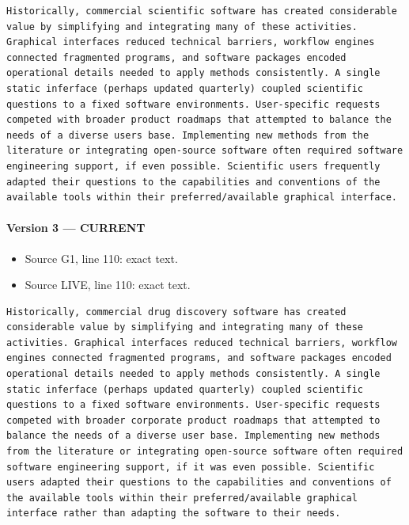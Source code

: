 \documentclass[11pt]{article}
\begin{document}
\begin{lstlisting}
Historically, commercial scientific software has created considerable value by simplifying and integrating many of these activities. Graphical interfaces reduced technical barriers, workflow engines connected fragmented programs, and software packages encoded operational details needed to apply methods consistently. A single static inferface (perhaps updated quarterly) coupled scientific questions to a fixed software environments. User-specific requests competed with broader product roadmaps that attempted to balance the needs of a diverse users base. Implementing new methods from the literature or integrating open-source software often required software engineering support, if even possible. Scientific users frequently adapted their questions to the capabilities and conventions of the available tools within their preferred/available graphical interface.
\end{lstlisting}

\paragraph{Version 3 --- CURRENT}

\begin{itemize}[leftmargin=*]
\item Source G1, line 110: exact text.
\item Source LIVE, line 110: exact text.
\end{itemize}

\begin{lstlisting}
Historically, commercial drug discovery software has created considerable value by simplifying and integrating many of these activities. Graphical interfaces reduced technical barriers, workflow engines connected fragmented programs, and software packages encoded operational details needed to apply methods consistently. A single static inferface (perhaps updated quarterly) coupled scientific questions to a fixed software environments. User-specific requests competed with broader corporate product roadmaps that attempted to balance the needs of a diverse user base. Implementing new methods from the literature or integrating open-source software often required software engineering support, if it was even possible. Scientific users adapted their questions to the capabilities and conventions of the available tools within their preferred/available graphical interface rather than adapting the software to their needs.
\end{lstlisting}
\end{document}
